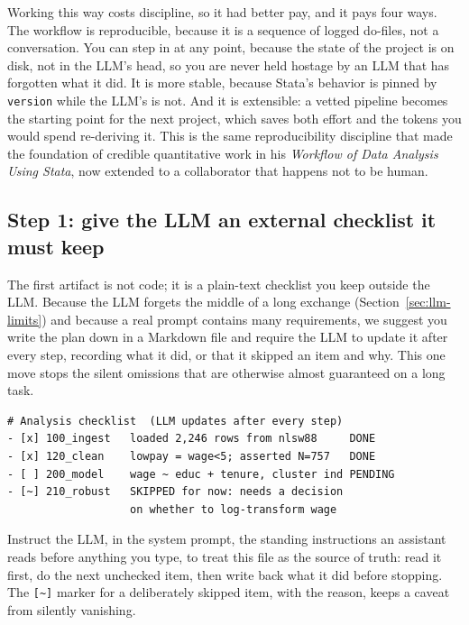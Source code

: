 \documentclass[
    a4paper,
    fontsize=10pt,
    twoside=true,
    numbers=noenddot,
]{kaobook}
\begin{document}
Working this way costs discipline, so it had better pay, and it pays four ways. The workflow is reproducible, because it is a sequence of logged do-files, not a conversation. You can step in at any point, because the state of the project is on disk, not in the LLM's head, so you are never held hostage by an LLM that has forgotten what it did. It is more stable, because Stata's behavior is pinned by \texttt{version} while the LLM's is not. And it is extensible: a vetted pipeline becomes the starting point for the next project, which saves both effort and the tokens you would spend re-deriving it. This is the same reproducibility discipline that \textcite{long2009workflow} made the foundation of credible quantitative work in his \emph{Workflow of Data Analysis Using Stata}, now extended to a collaborator that happens not to be human.

\subsection{Step 1: give the LLM an external checklist it must keep}
The first artifact is not code; it is a plain-text checklist you keep outside the LLM. Because the LLM forgets the middle of a long exchange (Section~\ref{sec:llm-limits}) and because a real prompt contains many requirements, we suggest you write the plan down in a Markdown file and require the LLM to update it after every step, recording what it did, or that it skipped an item and why. This one move stops the silent omissions that are otherwise almost guaranteed on a long task.

\begin{kaobox}[frametitle=The checklist the LLM maintains: \texttt{TODO.md}]
\par
{\footnotesize
\begin{verbatim}
# Analysis checklist  (LLM updates after every step)
- [x] 100_ingest   loaded 2,246 rows from nlsw88     DONE
- [x] 120_clean    lowpay = wage<5; asserted N=757   DONE
- [ ] 200_model    wage ~ educ + tenure, cluster ind PENDING
- [~] 210_robust   SKIPPED for now: needs a decision
                   on whether to log-transform wage
\end{verbatim}
}
Instruct the LLM, in the system prompt, the standing instructions an assistant reads before anything you type, to treat this file as the source of truth: read it first, do the next unchecked item, then write back what it did before stopping. The \texttt{[\textasciitilde]} marker for a deliberately skipped item, with the reason, keeps a caveat from silently vanishing.
\end{kaobox}
\end{document}
